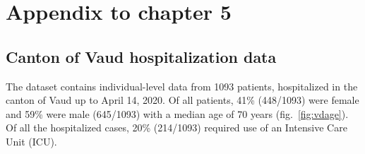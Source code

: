 %
%
%


\chapter{Appendix to chapter 5}

\section{Canton of Vaud hospitalization data}

The dataset contains individual-level data from 1093 patients, hospitalized in the canton of Vaud up to April 14, 2020. Of all patients, 41\% (448/1093) were female and 59\% were male (645/1093) with a median age of 70 years (fig.~\ref{fig:vdage}). Of all the hospitalized cases, 20\% (214/1093) required use of an Intensive Care Unit (ICU).

